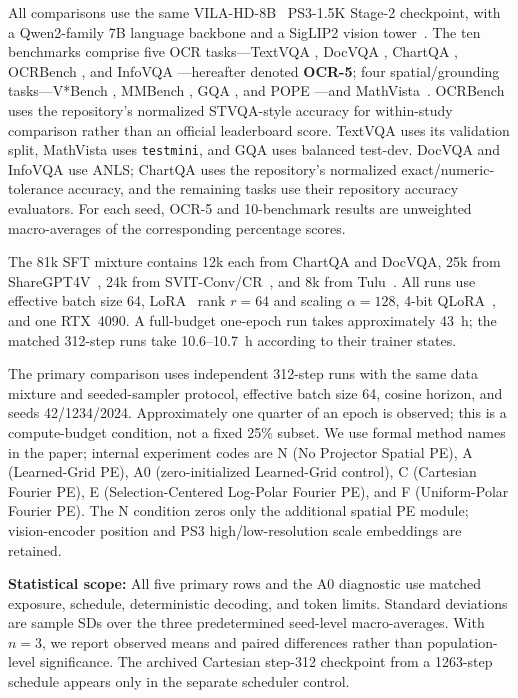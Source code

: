 \documentclass{article}
\begin{document}
All comparisons use the same VILA-HD-8B~\cite{ps3}
PS3-1.5K Stage-2 checkpoint, with a Qwen2-family 7B language
backbone and a SigLIP2 vision tower~\cite{siglip2}.
The ten benchmarks comprise five OCR tasks---TextVQA
\cite{textvqa}, DocVQA \cite{docvqa}, ChartQA \cite{chartqa},
OCRBench \cite{ocrbench}, and InfoVQA \cite{infovqa}---hereafter
denoted \textbf{OCR-5}; four spatial/grounding tasks---V*Bench
\cite{vstar}, MMBench \cite{mmbench}, GQA \cite{gqa}, and
POPE \cite{pope_bench}---and MathVista~\cite{mathvista}.
OCRBench uses the repository's normalized STVQA-style accuracy
for within-study comparison rather than an official leaderboard
score.
TextVQA uses its validation split, MathVista uses \texttt{testmini},
and GQA uses balanced test-dev. DocVQA and InfoVQA use ANLS;
ChartQA uses the repository's normalized exact/numeric-tolerance
accuracy, and the remaining tasks use their repository accuracy
evaluators. For each seed, OCR-5 and 10-benchmark results are
unweighted macro-averages of the corresponding percentage scores.

The 81k SFT mixture contains 12k each from ChartQA and DocVQA,
25k from ShareGPT4V~\cite{sharegpt4v},
24k from SVIT-Conv/CR~\cite{svit}, and 8k from
Tulu~\cite{tulu}.
All runs use effective batch size 64, LoRA~\cite{lora} rank
$r{=}64$ and scaling $\alpha{=}128$, 4-bit
QLoRA~\cite{qlora}, and one RTX~4090. A full-budget one-epoch
run takes approximately 43~h; the matched 312-step runs take
10.6--10.7~h according to their trainer states.

The primary comparison uses independent 312-step runs with the
same data mixture and seeded-sampler protocol, effective batch size 64, cosine
horizon, and seeds 42/1234/2024. Approximately one quarter of an
epoch is observed; this is a compute-budget condition, not a
fixed 25\% subset. We use formal method names in the paper;
internal experiment codes are N (No Projector Spatial PE), A
(Learned-Grid PE), A0 (zero-initialized Learned-Grid control), C
(Cartesian Fourier PE), E
(Selection-Centered Log-Polar Fourier PE), and F
(Uniform-Polar Fourier PE). The N condition zeros only the
additional spatial PE module; vision-encoder position and PS3
high/low-resolution scale embeddings are retained.

\textbf{Statistical scope:}
All five primary rows and the A0 diagnostic use matched exposure, schedule,
deterministic decoding, and token limits. Standard deviations
are sample SDs over the three predetermined seed-level macro-averages. With $n=3$,
we report observed means and paired differences rather than
population-level significance. The archived Cartesian
step-312 checkpoint from a 1263-step schedule appears only in
the separate scheduler control.
\end{document}
